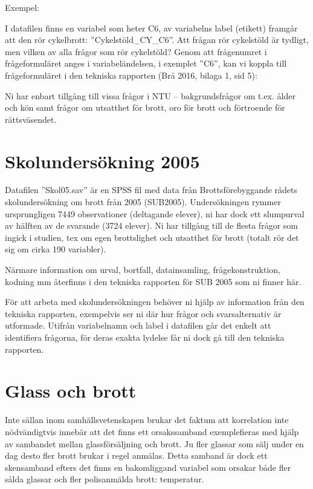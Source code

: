 \documentclass[
]{book}
\begin{document}
Exempel:

I datafilen finns en variabel som heter C6, av variabelns label (etikett) framgår att den rör
cykelbrott: ''Cykelstöld\_CY\_C6''. Att frågan rör cykelstöld är tydligt, men vilken av alla frågor
som rör cykelstöld? Genom att frågenumret i frågeformuläret anges i variabeländelsen, i
exemplet ''C6'', kan vi koppla till frågeformuläret i den tekniska rapporten (Brå 2016, bilaga 1,
sid 5):

Ni har enbart tillgång till vissa frågor i NTU -- bakgrundsfrågor om t.ex. ålder och kön samt
frågor om utsatthet för brott, oro för brott och förtroende för rättsväsendet.

\hypertarget{skolundersuxf6kning-2005}{%
\section{Skolundersökning 2005}\label{skolundersuxf6kning-2005}}

Datafilen ''Skol05.sav'' är en SPSS fil med data från Brottsförebyggande rådets
skolundersökning om brott från 2005 (SUB2005). Undersökningen rymmer ursprungligen 7449
observationer (deltagande elever), ni har dock ett slumpurval av hälften av de svarande (3724
elever). Ni har tillgång till de flesta frågor som ingick i studien, tex om egen brottslighet och
utsatthet för brott (totalt rör det sig om cirka 190 variabler).

Närmare information om urval, bortfall, datainsamling, frågekonstruktion, kodning mm återfinns
i den tekniska rapporten för SUB 2005 som ni finner här.

För att arbeta med skolundersökningen behöver ni hjälp av information från den tekniska
rapporten, exempelvis ser ni där hur frågor och svarsalternativ är utformade. Utifrån variabelnamn och label i datafilen går det enkelt att identifiera frågorna, för deras exakta
lydelse får ni dock gå till den tekniska rapporten.

\hypertarget{glass-och-brott}{%
\section{Glass och brott}\label{glass-och-brott}}

Inte sällan inom samhällsvetenskapen brukar det faktum att korrelation inte nödvändigtvis innebär att det finns ett orsakssamband exemplefieras med hjälp av sambandet mellan glassförsäljning och brott. Ju fler glassar som sälj under en dag desto fler brott brukar i regel anmälas. Detta samband är dock ett skensamband efters det finns en bakomliggand variabel som orsakar både fler sålda glassar och fler polisanmälda brott: temperatur.
\end{document}
